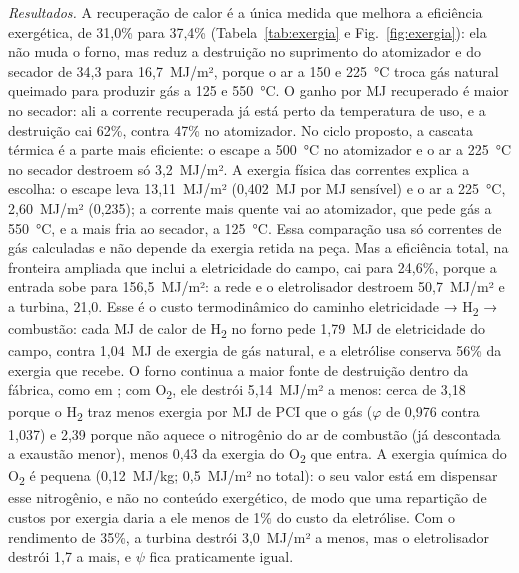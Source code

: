 \documentclass[10pt,a4paper,twocolumn]{article}
\newcommand{\Ht}{H\textsubscript{2}}
\newcommand{\Ot}{O\textsubscript{2}}
\begin{document}
\textit{Resultados.} A recuperação de calor é a única medida que melhora a eficiência exergética, de 31,0\% para 37,4\% (Tabela~\ref{tab:exergia} e Fig.~\ref{fig:exergia}): ela não muda o forno, mas reduz a destruição no suprimento do atomizador e do secador de 34,3 para 16,7~MJ/m², porque o ar a 150 e 225~°C troca gás natural queimado para produzir gás a 125 e 550~°C. O ganho por MJ recuperado é maior no secador: ali a corrente recuperada já está perto da temperatura de uso, e a destruição cai 62\%, contra 47\% no atomizador. No ciclo proposto, a cascata térmica é a parte mais eficiente: o escape a 500~°C no atomizador e o ar a 225~°C no secador destroem só 3,2~MJ/m². A exergia física das correntes explica a escolha: o escape leva 13,11~MJ/m² (0,402~MJ por MJ sensível) e o ar a 225~°C, 2,60~MJ/m² (0,235); a corrente mais quente vai ao atomizador, que pede gás a 550~°C, e a mais fria ao secador, a 125~°C. Essa comparação usa só correntes de gás calculadas e não depende da exergia retida na peça. Mas a eficiência total, na fronteira ampliada que inclui a eletricidade do campo, cai para 24,6\%, porque a entrada sobe para 156,5~MJ/m²: a rede e o eletrolisador destroem 50,7~MJ/m² e a turbina, 21,0. Esse é o custo termodinâmico do caminho eletricidade → \Ht{} → combustão: cada MJ de calor de \Ht{} no forno pede 1,79~MJ de eletricidade do campo, contra 1,04~MJ de exergia de gás natural, e a eletrólise conserva 56\% da exergia que recebe. O forno continua a maior fonte de destruição dentro da fábrica, como em \cite{ferrer2019,wang2020}; com \Ot, ele destrói 5,14~MJ/m² a menos: cerca de 3,18 porque o \Ht{} traz menos exergia por MJ de PCI que o gás ($\varphi$ de 0,976 contra 1,037) e 2,39 porque não aquece o nitrogênio do ar de combustão (já descontada a exaustão menor), menos 0,43 da exergia do \Ot{} que entra. A exergia química do \Ot{} é pequena (0,12~MJ/kg; 0,5~MJ/m² no total): o seu valor está em dispensar esse nitrogênio, e não no conteúdo exergético, de modo que uma repartição de custos por exergia daria a ele menos de 1\% do custo da eletrólise. Com o rendimento de 35\%, a turbina destrói 3,0~MJ/m² a menos, mas o eletrolisador destrói 1,7 a mais, e $\psi$ fica praticamente igual.
\end{document}
